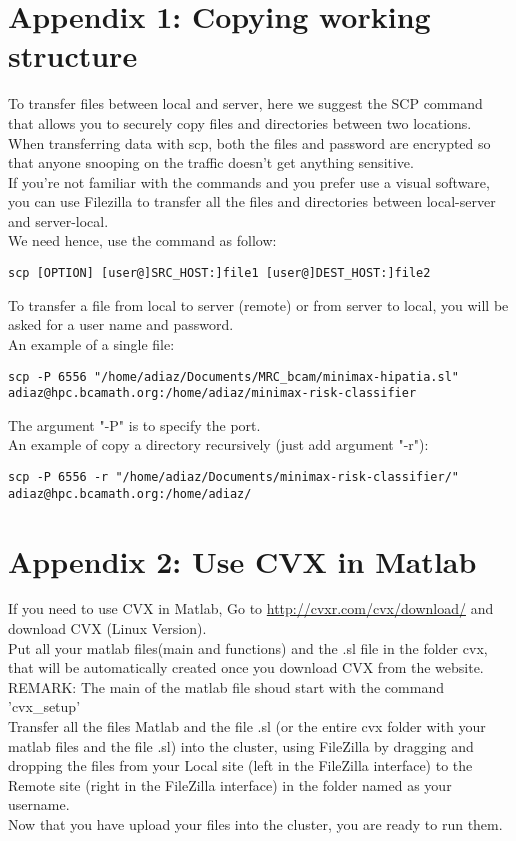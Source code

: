 \documentclass[a4paper]{article}
\begin{document}
	\section{Appendix 1: Copying working structure}
		To transfer files between local and server, here we suggest the SCP command that allows you to securely copy files and directories between two locations.\\
		When transferring data with scp, both the files and password are encrypted so that anyone snooping on the traffic doesn’t get anything sensitive.\\
		If you're not familiar with the commands and you prefer use a visual software, you can use Filezilla to transfer all the files and directories between local-server and server-local.\\
		We need hence, use the command as follow:
		\begin{lstlisting}[caption=scp command, label=lst:scpCommand]
			scp [OPTION] [user@]SRC_HOST:]file1 [user@]DEST_HOST:]file2
		\end{lstlisting}
		To transfer a file from local to server (remote) or from server to local, you will be asked for a user name and password.\\
		An example of a single file:
		\begin{lstlisting}[caption=scp example file, label=lst:scpExampleFile]
			scp -P 6556 "/home/adiaz/Documents/MRC_bcam/minimax-hipatia.sl" adiaz@hpc.bcamath.org:/home/adiaz/minimax-risk-classifier 
		\end{lstlisting}
		The argument "-P" is to specify the port.\\
		An example of copy a directory recursively (just add argument "-r"):
		\begin{lstlisting}[caption=scp example directory, label=lst:scpExampleDirectory]
			scp -P 6556 -r "/home/adiaz/Documents/minimax-risk-classifier/" adiaz@hpc.bcamath.org:/home/adiaz/
		\end{lstlisting}
		
	\section{Appendix 2: Use CVX in Matlab}
		If you need to use CVX in Matlab, Go to \url{http://cvxr.com/cvx/download/} and download CVX (Linux Version).\\
		Put all your matlab files(main and functions) and the .sl file
		in the folder cvx, that will be automatically created once you download CVX
		from the website.\\
		REMARK: The main of the matlab file shoud start with the command
		'cvx_setup'\\
		Transfer all the files Matlab and the file .sl (or the entire
		cvx folder with your matlab files and the file .sl) into the cluster,
		using FileZilla by dragging and dropping the files from your Local site (left in
		the FileZilla interface) to the Remote site (right in the FileZilla interface) in the folder named as your username.\\
		Now that you have upload your files into the cluster, you are ready to run
		them.\\
\end{document}
